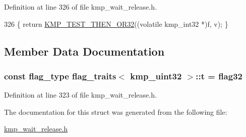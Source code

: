 Definition at line 326 of file kmp\-\_\-wait\-\_\-release.\-h.


\begin{DoxyCode}
326 \{ \textcolor{keywordflow}{return} \hyperlink{kmp__os_8h_a181d2a30bc941dab902d9006c3faa606}{KMP\_TEST\_THEN\_OR32}((\textcolor{keyword}{volatile} kmp\_int32 *)f, v); \}
\end{DoxyCode}


\subsection{Member Data Documentation}
\hypertarget{structflag__traits_3_01kmp__uint32_01_4_a28ceb6f9e5394c786d49d3849f29ba78}{
\subsubsection[{t}]{\setlength{\rightskip}{0pt plus 5cm}const {\bf flag\-\_\-type} {\bf flag\-\_\-traits}$<$ kmp\-\_\-uint32 $>$\-::t = {\bf flag32}\hspace{0.3cm}{\ttfamily [static]}}}\label{structflag__traits_3_01kmp__uint32_01_4_a28ceb6f9e5394c786d49d3849f29ba78}


Definition at line 323 of file kmp\-\_\-wait\-\_\-release.\-h.



The documentation for this struct was generated from the following file\-:\begin{DoxyCompactItemize}
\item 
\hyperlink{kmp__wait__release_8h}{kmp\-\_\-wait\-\_\-release.\-h}\end{DoxyCompactItemize}
